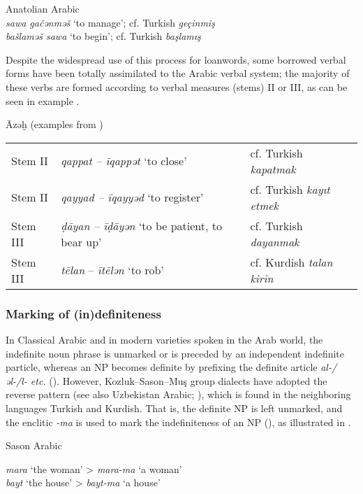 \documentclass[output=paper]{langsci/langscibook}
\begin{document}
\ea \label{turkverb} Anatolian Arabic \citep[184]{Talay2007}\\
\noindent \textit{sawa gačənməš} `to manage'; cf. Turkish \textit{geçinmiş}\\
\textit{ba\v{s}lamə\v{s} sawa} `to begin';  cf. Turkish \textit{başlamış} \\
\z

Despite the widespread use of this process for loanwords, some borrowed verbal forms have been totally assimilated to the Arabic
verbal system; the majority of these verbs are formed according to verbal measures (stems) II or III, as can be seen in example . 


\ea \label{azex} Āzəḫ (examples from \citealt{Talay2007})
\begin{tabular}{@{}lll@{}}
Stem II & \textit{qappat – īqappət} `to close' & cf. Turkish \textit{ kapatmak} \\
Stem II & \textit{qayyad – īqayyəd} `to register' & cf. Turkish \textit{kayıt etmek}\\
Stem III & \textit{\d{d}āyan – ī\d{d}āyən} `to be patient, to bear up' & cf. Turkish \textit{dayanmak}\\
Stem III & \textit{tēlan} – \textit{ītēlən} `to rob' & cf. Kurdish \textit{talan kirin} \\
\end{tabular}
\z


 \subsubsection{Marking of (in)definiteness}
 
 
In Classical Arabic and in modern varieties spoken in the Arab world, the indefinite noun phrase is unmarked or is preceded by an independent indefinite particle, whereas an NP becomes definite by prefixing the definite article \textit{al-/əl-/l- etc.} (\citealt{Brustad2000}). However, Kozluk--Sason--Mu\c{s} group dialects have adopted the reverse pattern (see also Uzbekistan Arabic; \citealt{Jastrow2005}), which is found in the neighboring languages Turkish and Kurdish. That is, the definite NP is left unmarked, and the enclitic \textit{-ma} is used to mark the indefiniteness of an NP (\citealt{Talay2007,Akkus2016,Akkus2017,AkinJastrowTalay2017,AkkusBenmamoun2018}), as illustrated in . 

\ea \label{ma} Sason Arabic

\textit{mara} `the woman' > \textit{mara-ma} `a woman' \\
\textit{bayt} `the house' > \textit{bayt-ma} `a house'
\z
\end{document}
